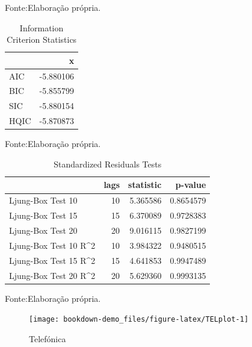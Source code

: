 \documentclass[
  12pt,
  a4paper,
  openany]{book}
\begin{document}
Fonte:Elaboração própria.

\justifying
\bigskip

\begin{table}[!h]

\caption{\label{tab:unnamed-chunk-19}Information Criterion Statistics}
\centering
\begin{tabular}[t]{lr}
\toprule
  & x\\
\midrule
AIC & -5.880106\\
BIC & -5.855799\\
SIC & -5.880154\\
HQIC & -5.870873\\
\bottomrule
\end{tabular}
\end{table}
\FloatBarrier
\centering

Fonte:Elaboração própria.

\justifying
\bigskip

\begin{table}[!h]

\caption{\label{tab:unnamed-chunk-20}Standardized Residuals Tests}
\centering
\begin{tabular}[t]{lrrr}
\toprule
  & lags & statistic & p-value\\
\midrule
Ljung-Box Test 10 & 10 & 5.365586 & 0.8654579\\
Ljung-Box Test 15 & 15 & 6.370089 & 0.9728383\\
Ljung-Box Test 20 & 20 & 9.016115 & 0.9827199\\
Ljung-Box Test 10 R\textasciicircum{}2 & 10 & 3.984322 & 0.9480515\\
Ljung-Box Test 15 R\textasciicircum{}2 & 15 & 4.641853 & 0.9947489\\
\addlinespace
Ljung-Box Test 20 R\textasciicircum{}2 & 20 & 5.629360 & 0.9993135\\
\bottomrule
\end{tabular}
\end{table}
\FloatBarrier
\centering

Fonte:Elaboração própria.

\justifying
\bigskip
\begin{figure}

{\centering \texttt{[image: bookdown-demo\_files/figure-latex/TELplot-1]} 

}

\caption{Telefónica}\label{fig:TELplot}
\end{figure}
\FloatBarrier
\centering
\end{document}
